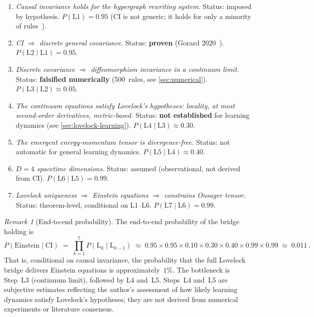 \documentclass[11pt]{article}
\theoremstyle{definition}
\theoremstyle{remark}
\newtheorem{remark}[theorem]{Remark}
\begin{document}
\begin{enumerate}
\item[\textbf{L1.}] \textit{Causal invariance holds for the hypergraph
  rewriting system.}
  Status: imposed by hypothesis.
  $P(\text{L1}) = 0.95$ (CI is not generic; it holds for only a minority
  of rules~\cite{Wolfram2020,Gorard2020}).

\item[\textbf{L2.}] \textit{CI $\Rightarrow$ discrete general covariance.}
  Status: \textbf{proven} (Gorard 2020~\cite{Gorard2020}).
  $P(\text{L2} \mid \text{L1}) = 0.95$.

\item[\textbf{L3.}] \textit{Discrete covariance $\Rightarrow$
  diffeomorphism invariance in a continuum limit.}
  Status: \textbf{falsified numerically} (500~rules, see \cref{sec:numerical}).
  $P(\text{L3} \mid \text{L2}) \approx 0.05$.

\item[\textbf{L4.}] \textit{The continuum equations satisfy Lovelock's
  hypotheses: locality, at most second-order derivatives, metric-based.}
  Status: \textbf{not established} for learning dynamics
  (see \cref{sec:lovelock-learning}).
  $P(\text{L4} \mid \text{L3}) \approx 0.30$.

\item[\textbf{L5.}] \textit{The emergent energy-momentum tensor is
  divergence-free.}
  Status: not automatic for general learning dynamics.
  $P(\text{L5} \mid \text{L4}) \approx 0.40$.

\item[\textbf{L6.}] \textit{$D = 4$ spacetime dimensions.}
  Status: assumed (observational, not derived from CI).
  $P(\text{L6} \mid \text{L5}) = 0.99$.

\item[\textbf{L7.}] \textit{Lovelock uniqueness $\Rightarrow$ Einstein
  equations $\Rightarrow$ constrains Onsager tensor.}
  Status: theorem-level, conditional on L1--L6.
  $P(\text{L7} \mid \text{L6}) = 0.99$.
\end{enumerate}

\begin{remark}[End-to-end probability]
\label{rem:probability}
The end-to-end probability of the bridge holding is
\begin{equation}
\label{eq:bridge-probability}
P(\text{Einstein} \mid \text{CI}) \;=\;
\prod_{k=1}^{7} P(\text{L}_k \mid \text{L}_{k-1})
\;\approx\; 0.95 \times 0.95 \times 0.10 \times 0.30 \times 0.40 \times 0.99 \times 0.99
\;\approx\; 0.011\,.
\end{equation}
That is, conditional on causal invariance, the probability that the full
Lovelock bridge delivers Einstein equations is approximately~$1\%$.
The bottleneck is Step~L3 (continuum limit), followed by L4 and~L5.
Steps~L4 and~L5 are subjective estimates reflecting the author's
assessment of how likely learning dynamics satisfy Lovelock's
hypotheses; they are not derived from numerical experiments or
literature consensus.
\end{remark}
\end{document}
